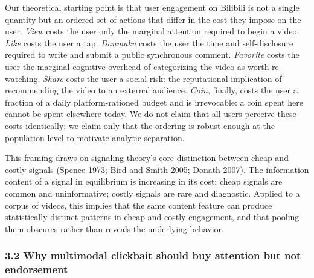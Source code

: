\documentclass[
  12pt,
]{article}
\begin{document}
Our theoretical starting point is that user engagement on Bilibili is
not a single quantity but an ordered set of actions that differ in the
cost they impose on the user. \emph{View} costs the user only the
marginal attention required to begin a video. \emph{Like} costs the user
a tap. \emph{Danmaku} costs the user the time and self-disclosure
required to write and submit a public synchronous comment.
\emph{Favorite} costs the user the marginal cognitive overhead of
categorizing the video as worth re-watching. \emph{Share} costs the user
a social risk: the reputational implication of recommending the video to
an external audience. \emph{Coin}, finally, costs the user a fraction of
a daily platform-rationed budget and is irrevocable: a coin spent here
cannot be spent elsewhere today. We do not claim that all users perceive
these costs identically; we claim only that the ordering is robust
enough at the population level to motivate analytic separation.

This framing draws on signaling theory's core distinction between cheap
and costly signals (Spence 1973; Bird and Smith 2005; Donath 2007). The
information content of a signal in equilibrium is increasing in its
cost: cheap signals are common and uninformative; costly signals are
rare and diagnostic. Applied to a corpus of videos, this implies that
the same content feature can produce statistically distinct patterns in
cheap and costly engagement, and that pooling them obscures rather than
reveals the underlying behavior.

\subsubsection{3.2 Why multimodal clickbait should buy attention but not
endorsement}\label{why-multimodal-clickbait-should-buy-attention-but-not-endorsement}
\end{document}
